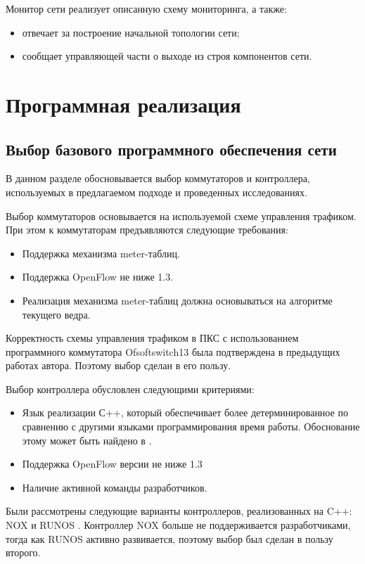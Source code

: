 \documentclass[12pt, a4paper]{article}
\begin{document}
Монитор сети реализует описанную схему мониторинга, а также:
\begin{itemize}
	\item отвечает за построение начальной топологии сети;
	\item сообщает управляющей части о выходе из строя компонентов сети.
\end{itemize}

\section{Программная реализация}
\subsection{Выбор базового программного обеспечения сети}

В данном разделе обосновывается выбор коммутаторов и контроллера, используемых в предлагаемом подходе и проведенных исследованиях.

Выбор коммутаторов основывается на используемой схеме управления трафиком. При этом к коммутаторам предъявляются следующие требования:
\begin{itemize}
	\item Поддержка механизма meter-таблиц.
	\item Поддержка OpenFlow не ниже 1.3.
	\item Реализация механизма meter-таблиц должна основываться на алгоритме текущего ведра.
\end{itemize}

Корректность схемы управления трафиком в ПКС с использованием программного коммутатора Ofsoftswitch13 \cite{ofsoftswitch} была подтверждена в предыдущих работах автора. Поэтому выбор сделан в его пользу.

Выбор контроллера обусловлен следующими критериями:
\begin{itemize}
	\item Язык реализации С++, который обеспечивает более детерминированное по сравнению с другими языками программирования время работы. Обоснование этому может быть найдено в \cite{cpp}.
	\item Поддержка OpenFlow версии не ниже 1.3
	\item Наличие активной команды разработчиков.
\end{itemize}

Были рассмотрены следующие варианты контроллеров, реализованных на C++: NOX \cite{nox} и RUNOS \cite{runos}. Контроллер NOX больше не поддерживается разработчиками, тогда как RUNOS активно развивается, поэтому выбор был сделан в пользу второго.
\end{document}

